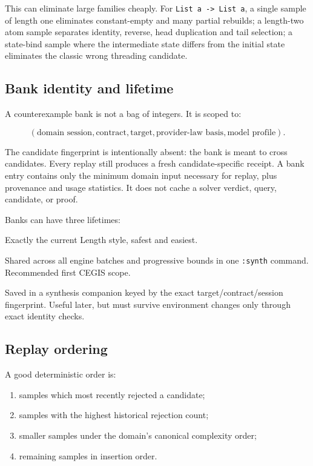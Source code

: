 \documentclass[11pt,oneside]{report}
\newcommand{\code}[1]{\texttt{#1}}
\begin{document}
This can eliminate large families cheaply. For \code{List a -> List a}, a single sample of length one eliminates constant-empty and many partial rebuilds; a length-two atom sample separates identity, reverse, head duplication and tail selection; a state-bind sample where the intermediate state differs from the initial state eliminates the classic wrong threading candidate.

\subsection{Bank identity and lifetime}

A counterexample bank is not a bag of integers. It is scoped to:

\[
(\text{domain session},\text{contract},\text{target},\text{provider-law basis},
 \text{model profile}).
\]

The candidate fingerprint is intentionally absent: the bank is meant to cross candidates. Every replay still produces a fresh candidate-specific receipt. A bank entry contains only the minimum domain input necessary for replay, plus provenance and usage statistics. It does not cache a solver verdict, query, candidate, or proof.

Banks can have three lifetimes:

\begin{description}[leftmargin=2.2em,style=nextline]
\item[Batch-local.] Exactly the current Length style, safest and easiest.
\item[Command-local.] Shared across all engine batches and progressive bounds in one \code{:synth} command. Recommended first CEGIS scope.
\item[Persistent.] Saved in a synthesis companion keyed by the exact target/contract/session fingerprint. Useful later, but must survive environment changes only through exact identity checks.
\end{description}

\subsection{Replay ordering}

A good deterministic order is:

\begin{enumerate}[leftmargin=2em]
\item samples which most recently rejected a candidate;
\item samples with the highest historical rejection count;
\item smaller samples under the domain's canonical complexity order;
\item remaining samples in insertion order.
\end{enumerate}
\end{document}
